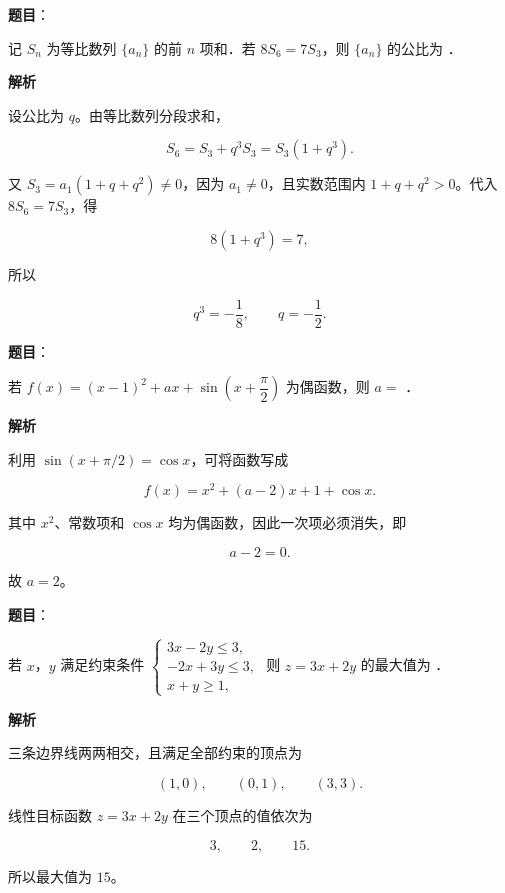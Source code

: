 \begin{answer}

\textbf{题目}：

记 $S_n$ 为等比数列 $\{a_n\}$ 的前 $n$ 项和．若 $8S_6=7S_3$，则 $\{a_n\}$ 的公比为 \gkblank{}．

\textbf{解析}

设公比为 $q$。由等比数列分段求和，

\nopagebreak[4]
\[
S_6=S_3+q^3S_3=S_3(1+q^3).
\]

又 $S_3=a_1(1+q+q^2)\ne0$，因为 $a_1\ne0$，且实数范围内 $1+q+q^2>0$。代入 $8S_6=7S_3$，得

\nopagebreak[4]
\[
8(1+q^3)=7,
\]

所以

\nopagebreak[4]
\[
q^3=-\frac18,\qquad q=-\frac12.
\]


\end{answer}
\begin{answer}

\textbf{题目}：

若 $f(x)=(x-1)^2+ax+\sin\left(x+\dfrac\pi2\right)$ 为偶函数，则 $a=$ \gkblank{}．

\textbf{解析}

利用 $\sin(x+\pi/2)=\cos x$，可将函数写成

\nopagebreak[4]
\[
f(x)=x^2+(a-2)x+1+\cos x.
\]

其中 $x^2$、常数项和 $\cos x$ 均为偶函数，因此一次项必须消失，即

\nopagebreak[4]
\[
a-2=0.
\]

故 $a=2$。


\end{answer}
\begin{answer}

\textbf{题目}：

若 $x$，$y$ 满足约束条件 $\begin{cases}3x-2y\leqslant3,\\-2x+3y\leqslant3,\\x+y\geqslant1,\end{cases}$ 则 $z=3x+2y$ 的最大值为 \gkblank{}．

\textbf{解析}

三条边界线两两相交，且满足全部约束的顶点为

\nopagebreak[4]
\[
(1,0),\qquad(0,1),\qquad(3,3).
\]

线性目标函数 $z=3x+2y$ 在三个顶点的值依次为

\nopagebreak[4]
\[
3,\qquad2,\qquad15.
\]

所以最大值为 $15$。


\end{answer}
